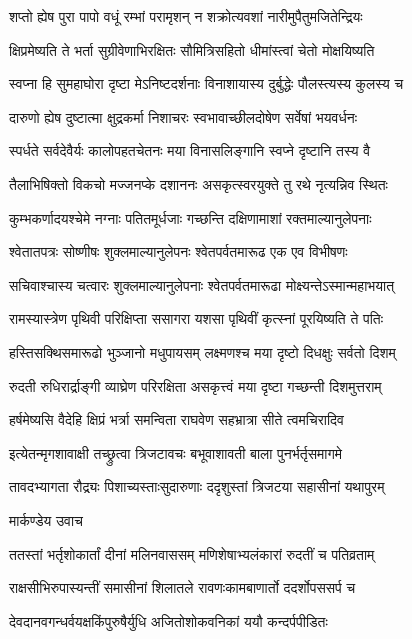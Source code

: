\twolineshloka
{शप्तो ह्येष पुरा पापो वधूं रम्भां परामृशन्}
{न शक्रोत्यवशां नारीमुपैतुमजितेन्द्रियः}


\twolineshloka
{क्षिप्रमेष्यति ते भर्ता सुग्रीवेणाभिरक्षितः}
{सौमित्रिसहितो धीमांस्त्वां चेतो मोक्षयिष्यति}


\twolineshloka
{स्वप्ना हि सुमहाघोरा दृष्टा मेऽनिष्टदर्शनाः}
{विनाशायास्य दुर्बुद्धेः पौलस्त्यस्य कुलस्य च}


\twolineshloka
{दारुणो ह्येष दुष्टात्मा क्षुद्रकर्मा निशाचरः}
{स्वभावाच्छीलदोषेण सर्वेषां भयवर्धनः}


\twolineshloka
{स्पर्धते सर्वदेवैर्यः कालोपहतचेतनः}
{मया विनासलिङ्गानि स्वप्ने दृष्टानि तस्य वै}


\twolineshloka
{तैलाभिषिक्तो विकचो मज्जनप्के दशाननः}
{असकृत्स्वरयुक्ते तु रथे नृत्यन्निव स्थितः}


\twolineshloka
{कुम्भकर्णादयश्चेमे नग्नाः पतितमूर्धजाः}
{गच्छन्ति दक्षिणामाशां रक्तमाल्यानुलेपनाः}


\twolineshloka
{श्वेतातपत्रः सोष्णीषः शुक्लमाल्यानुलेपनः}
{श्वेतपर्वतमारूढ एक एव विभीषणः}


\twolineshloka
{सचिवाश्चास्य चत्वारः शुक्लमाल्यानुलेपनाः}
{श्वेतपर्वतमारूढा मोक्ष्यन्तेऽस्मान्महाभयात्}


\twolineshloka
{रामस्यास्त्रेण पृथिवी परिक्षिप्ता ससागरा}
{यशसा पृथिवीं कृत्स्नां पूरयिष्यति ते पतिः}


\twolineshloka
{हस्तिसक्थिसमारूढो भुञ्जानो मधुपायसम्}
{लक्ष्मणश्च मया दृष्टो दिधक्षुः सर्वतो दिशम्}


\twolineshloka
{रुदती रुधिरार्द्राङ्गी व्याघ्रेण परिरक्षिता}
{असकृत्त्वं मया दृष्टा गच्छन्ती दिशमुत्तराम्}


\twolineshloka
{हर्षमेष्यसि वैदेहि क्षिप्रं भर्त्रा समन्विता}
{राघवेण सहभ्रात्रा सीते त्वमचिरादिव}


\twolineshloka
{इत्येतन्मृगशावाक्षी तच्छ्रुत्वा त्रिजटावचः}
{बभूवाशावती बाला पुनर्भर्तृसमागमे}


\twolineshloka
{तावदभ्यागता रौद्र्यः पिशाच्यस्ताःसुदारुणाः}
{ददृशुस्तां त्रिजटया सहासीनां यथापुरम्}


\twolineshloka
{मार्कण्डेय उवाच}
{}


\twolineshloka
{ततस्तां भर्तृशोकार्तां दीनां मलिनवाससम्}
{मणिशेषाभ्यलंकारां रुदतीं च पतिव्रताम्}


\twolineshloka
{राक्षसीभिरुपास्यन्तीं समासीनां शिलातले}
{रावणःकामबाणार्तो ददर्शोपससर्प च}


\twolineshloka
{देवदानवगन्धर्वयक्षकिंपुरुषैर्युधि}
{अजितोशोकवनिकां ययौ कन्दर्पपीडितः}


